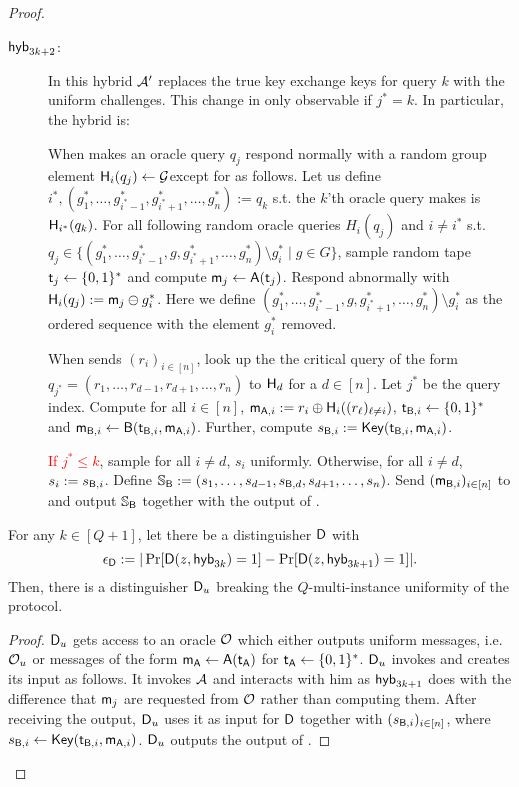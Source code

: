 \begin{proof}
\begin{description}
 \item[$\mathsf{hyb}_{3k+2}$:]  In this hybrid $\mathcal{A}'$ replaces the true key exchange keys for query $k$ with the uniform challenges. This change in only observable if $j^*=k$. In  particular, the hybrid is:
 
 
 When \Adv makes an oracle query $q_{j}$ respond normally with a random group element $\mathsf{H}_i(q_{j})\leftarrow\mathcal{G}$except for as follows. Let us define $i^*, (g^*_1,\dots, g^*_{i^*-1},g^*_{i^*+1},\dots, g^*_{n}):=q_k$ s.t. the $k$'th oracle query \Adv makes is $\mathsf{H}_{i^*}(q_{k})$. 
For all following random oracle queries $H_i(q_j)$ and $i\neq i^*$ s.t. $q_j\in \{ (g^*_1,\dots, g^*_{i^*-1}, g,g^*_{i^*+1},\dots, g^*_{n}) \setminus g^*_i \mid g\in G \}$, sample random tape $\mathsf{t}_j\leftarrow\{0,1\}^*$ and compute $\mathsf{m}_{j}\leftarrow\mathsf{A}(\mathsf{t}_j)$. 
Respond abnormally with $\mathsf{H}_i(q_j):=\mathsf{m}_j\ominus g^*_{i}$. Here we define $(g^*_1,\dots, g^*_{i^*-1}, g,g^*_{i^*+1},\dots, g^*_{n}) \setminus g^*_i$ as the ordered sequence with the element $g^*_i$ removed. 
 
 When \Adv sends $(r_i)_{i\in[n]}$, look up the the critical query of the form $q_{j^*}= (r_1,\dots, r_{d-1},r_{d+1},\dots, r_{n})$ to $\mathsf{H}_d$ for a $d\in[n]$. Let $j^*$ be the query index. Compute for all $i\in[n]$, $\mathsf{m}_{\mathsf{A},i}:=r_i\oplus\mathsf{H}_i((r_\ell)_{\ell\neq i})$, $\mathsf{t}_{\mathsf{B},i}\leftarrow\{0,1\}^*$ and $\mathsf{m}_{\mathsf{B},i}\leftarrow\mathsf{B}(\mathsf{t}_{\mathsf{B},i},\mathsf{m}_{\mathsf{A},i})$. Further, compute $s_{\mathsf{B},i}:=\mathsf{Key}(\mathsf{t}_{\mathsf{B},i},\mathsf{m}_{\mathsf{A},i})$. 
 
 \textcolor{red}{If $j^*\leq k$}, sample for all $i\neq d$, $s_i$ uniformly. Otherwise, for all $i\neq d$, $s_i:=s_{\mathsf{B},i}$.   Define $\mathsf{\mathbb S}_{\mathsf{B}}:=(s_{1},\dots, s_{d-1},s_{\mathsf{B},d},s_{d+1},\dots, s_{n})$.  
 Send $(\mathsf{m}_{\mathsf{B},i})_{i\in[n]}$ to \Adv and output $\mathsf{\mathbb S}_{\mathsf{B}}$ together with the output of \Adv. 
 
\end{description}

\begin{claim}\label{claim:first}
For any $k\in[Q+1]$, let there be a distinguisher $\mathsf D$ with
$$
\epsilon_{\mathsf D}:=|\Pr[\mathsf D(z,\mathsf{hyb}_{3k})=1] -\Pr[\mathsf D(z,\mathsf{hyb}_{3k+1})=1]|.
$$
Then, there is a distinguisher $\mathsf D_u$ breaking the $Q$-multi-instance uniformity of the \UKA protocol.
\end{claim}

\begin{proof}
 $\mathsf D_u$ gets access to an oracle $\mathcal{O}$ which either outputs uniform messages, i.e. $\mathcal{O}_u$ or messages of  the form $\mathsf{m}_\mathsf{A}\leftarrow\mathsf{A}(\mathsf{t}_\mathsf{A})$ for $\mathsf{t}_\mathsf{A}\leftarrow\{0,1\}^*$. $\mathsf D_u$ invokes \D and creates its input as follows. It invokes $\mathcal{A}$ and interacts with him as $\mathsf{hyb}_{3k+1}$ does with the difference that $\mathsf{m}_j$ are requested from $\mathcal{O}$ rather than computing them.  After receiving the output, $\mathsf D_u$ uses it as input for $\mathsf D$ together with $(s_{\mathsf{B},i})_{i\in[n]}$, where $s_{\mathsf{B},i}\leftarrow\mathsf{Key}(\mathsf{t}_{\mathsf{B},i},\mathsf{m}_{\mathsf{A},i})$. $\mathsf D_u$ outputs the output of \D. 


\end{proof}
\end{proof}
